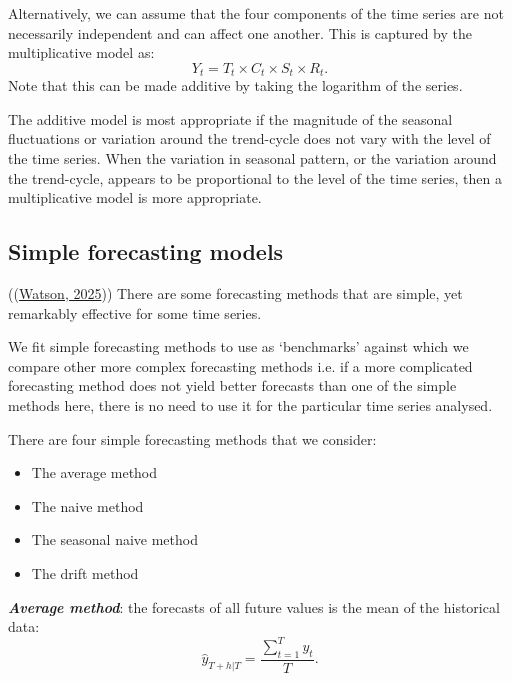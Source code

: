 \documentclass[a4paper, 10pt, fleqn]{article}
\begin{document}
\begin{flushleft}
      \vspace{1em}

      Alternatively, we can assume that the four components of the time series are not necessarily independent and can affect one another. This is captured by the multiplicative model as: $$Y_{t} = T_{t} \times C_{t} \times S_{t} \times R_{t}.$$ Note that this can be made additive by taking the logarithm of the series.

      \vspace{1em}

      The additive model is most appropriate if the magnitude of the seasonal fluctuations or variation around the trend-cycle does not vary with the level of the time series. When the variation in seasonal pattern, or the variation around the trend-cycle, appears to be proportional to the level of the time series, then a multiplicative model is more appropriate. 

    \subsection*{Simple forecasting models}

      ((\hyperref[Watson2025]{Watson, 2025})) There are some forecasting methods that are simple, yet remarkably effective for some time series.

      \vspace{1em}
      
      We fit simple forecasting methods to use as `benchmarks' against which we compare other more complex forecasting methods i.e. if a more complicated forecasting method does not yield better forecasts than one of the simple methods here, there is no need to use it for the particular time series analysed.

      \vspace{1em}

      There are four simple forecasting methods that we consider:
      \begin{itemize}
         \item The average method
         \item The naive method
         \item The seasonal naive method
         \item The drift method
      \end{itemize}

      \vspace{1em}

      \textbf{\textit{Average method}}: the forecasts of all future values is the mean of the historical data: $$\hat{y}_{T+h|T} = \frac{\sum_{t=1}^{T} y_{t}}{T}.$$


\end{flushleft}
\end{document}
